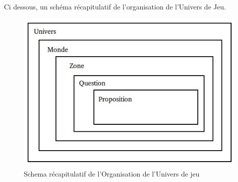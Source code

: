Ci dessous, un schéma récapitulatif de l'organisation de l'Univers de Jeu.
\begin{figure}[h]
	\includegraphics[scale=0.8]{figures/schema-univers.jpg}
	\caption{Schema récapitulatif de l'Organisation de l'Univers de jeu}
\end{figure}